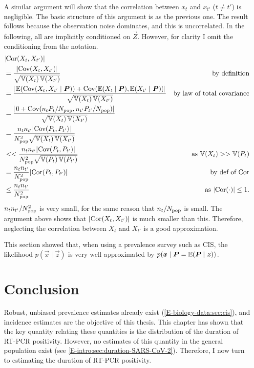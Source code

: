 \documentclass[thesis.tex]{subfiles}
\begin{document}
A similar argument will show that the correlation between $x_t$ and $x_{t'}$ ($t \neq t'$) is negligible.
The basic structure of this argument is as the previous one.
The result follows because the observation noise dominates, and this is uncorrelated.
In the following, all are implicitly conditioned on $\vec{Z}$.
However, for clarity I omit the conditioning from the notation.
\begin{align}
  &\lvert \operatorname{Cor}(X_t, X_{t'}) \rvert \\
  &= \frac{\lvert\operatorname{Cov}(X_t, X_{t'})\rvert}{\sqrt{\operatorname{\mathbb{V}}(X_t) \operatorname{\mathbb{V}}(X_{t'})}} &\text{by definition}\\
  &= \frac{\lvert \operatorname{\mathbb{E}}(\operatorname{Cov}(X_t, X_{t'} \mid \bm{P})) + \operatorname{Cov}(\operatorname{\mathbb{E}}(X_t \mid \bm{P}), \operatorname{\mathbb{E}}(X_{t'} \mid \bm{P})) \rvert}{\sqrt{\operatorname{\mathbb{V}}(X_t) \operatorname{\mathbb{V}}(X_{t'})}} &\text{by law of total covariance} \\
  &= \frac{\lvert 0 + \operatorname{Cov}(n_t P_t / N_\text{pop}, n_{t'} P_{t'} / N_\text{pop}) \rvert}{\sqrt{\operatorname{\mathbb{V}}(X_t) \operatorname{\mathbb{V}}(X_{t'})}} \\
  &= \frac{n_t n_{t'} \lvert \operatorname{Cov}(P_t, P_{t'}) \rvert}{N_\text{pop}^2 \sqrt{\operatorname{\mathbb{V}}(X_t) \operatorname{\mathbb{V}}(X_{t'})}}  \\
  &<< \frac{n_t n_{t'} \lvert \operatorname{Cov}(P_t, P_{t'}) \rvert}{N_\text{pop}^2 \sqrt{\operatorname{\mathbb{V}}(P_t) \operatorname{\mathbb{V}}(P_{t'})}} &\text{as $\operatorname{\mathbb{V}}(X_t) >> \operatorname{\mathbb{V}}(P_t)$} \\
  &= \frac{n_t n_{t'}}{N_\text{pop}^2} \lvert \operatorname{Cor}(P_t, P_{t'}) \rvert &\text{by def of $\operatorname{Cor}$}\\
  &\leq \frac{n_t n_{t'}}{N_\text{pop}^2} &\text{as $\lvert \operatorname{Cor}(\cdot) \rvert \leq 1$}.
\end{align}
$n_t n_{t'} / N_\text{pop}^2$ is very small, for the same reason that $n_t / N_\text{pop}$ is small.
The argument above shows that $\lvert \operatorname{Cor}(X_t, X_{t'}) \rvert$ is much smaller than this.
Therefore, neglecting the correlation between $X_t$ and $X_{t'}$ is a good approximation.

This section showed that, when using a prevalence survey such as CIS, the likelihood $p(\vec{x} \mid \vec{z})$ is very well approximated by $p(\bm{x} \mid \bm{P} = \operatorname{\mathbb{E}}(\bm{P} \mid \bm{z}))$.


\section{Conclusion} \label{inc-prev:sec:conclusion}

Robust, unbiased prevalence estimates already exist (\cref{E-biology-data:sec:cis}), and incidence estimates are the objective of this thesis.
This chapter has shown that the key quantity relating these quantities is the distribution of the duration of RT-PCR positivity.
However, no estimates of this quantity in the general population exist (see \cref{E-intro:sec:duration-SARS-CoV-2}).
Therefore, I now turn to estimating the duration of RT-PCR positivity.

\ifSubfilesClassLoaded{
  \listoftodos
}{}
\end{document}
